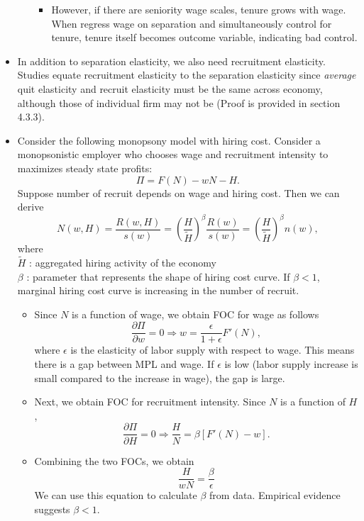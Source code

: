 \documentclass[a4paper, 12pt]{article}
\begin{document}
\begin{itemize}
\begin{itemize}
\begin{itemize}
\item However, if there are seniority wage scales, tenure grows with wage. When regress wage on separation and simultaneously control for tenure, tenure itself becomes outcome variable, indicating bad control.
\end{itemize}
\end{itemize}
\item In addition to separation elasticity, we also need recruitment elasticity. Studies equate recruitment elasticity to the separation elasticity since \emph{average} quit elasticity and recruit elasticity must be the same across economy, although those of individual firm may not be (Proof is provided in section 4.3.3).
\item Consider the following monopsony model with hiring cost. Consider a monopsonistic employer who chooses wage and recruitment intensity to maximizes steady state profits:
$$
\Pi = F(N) -wN-H.
$$
Suppose number of recruit depends on wage and hiring cost. Then we can derive 
\begin{equation}
N(w,H) =
\frac{R(w,H)}{s(w)}
=
\left(
\frac{H}{\tilde{H}}
\right)^{\beta}
\frac{R(w)}{s(w)}
=
\left(
\frac{H}{\tilde{H}}
\right)^{\beta}
n(w),
\label{eq:laborsupply}
\end{equation}
where \\
$\tilde{H}$ : aggregated hiring activity of the economy \\
$\beta$ : parameter that represents the shape of hiring cost curve. If $\beta<1$, marginal hiring cost curve is increasing in the number of recruit. 
\begin{itemize}
\item Since $N$ is a function of wage, we obtain FOC for wage as follows
\begin{equation}
\frac{\partial \Pi}{\partial w} = 0
\Rightarrow
w = \frac{\epsilon}{1+\epsilon}F'(N),
\end{equation}
where $\epsilon$ is the elasticity of labor supply with respect to wage. This means there is a gap between MPL and wage. If $\epsilon$ is low (labor supply increase is small compared to the increase in wage), the gap is large.
\item Next, we obtain FOC for recruitment intensity. Since $N$ is a function of $H$, 
\begin{equation}
\frac{\partial \Pi}{\partial H} = 0
\Rightarrow
\frac{H}{N}
=
\beta [F'(N)-w].
\end{equation}
\item Combining the two FOCs, we obtain
\begin{equation}
\frac{H}{wN}=\frac{\beta}{\epsilon}
\end{equation}
We can use this equation to calculate $\beta$ from data. Empirical evidence suggests $\beta<1.$ 
\end{itemize}
\end{itemize}
\end{document}
